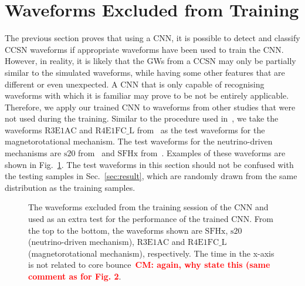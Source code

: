 \documentclass[aps,twocolumn,showpacs,groupedaddress, nofootinbib]{revtex4}  %
\newcommand{\cm}[1]{\textbf{\textcolor{red}{CM: #1}}}
\begin{document}
\section{Waveforms Excluded from Training}\label{sec:unseen}
%
%
The previous section proves that using a \ac{CNN}, it is possible to detect and
classify \ac{CCSN} waveforms if appropriate waveforms have been used to train
the \ac{CNN}. However, in reality, it is likely that the \acp{GW} from a
\ac{CCSN} may only be partially similar to the simulated waveforms, while
having some other features that are different or even unexpected. A \ac{CNN}
that is only capable of recognising waveforms with which it is familiar may
prove to be not be entirely applicable. Therefore, we apply our trained
\ac{CNN} to waveforms from other studies that were not used during the
training. Similar to the procedure used in~\cite{roma2019astrophysics}, we take
the waveforms $\text{R3E1AC}$ and $\text{R4E1FC\_L}$
from~\cite{scheidegger2010influence} as the test waveforms for the
magnetorotational mechanism. The test waveforms for the neutrino-driven
mechanisms are $\text{s}20$ from~\cite{andresen2017gravitational} and
$\text{SFHx}$ from~\cite{kuroda2016new}. Examples of these waveforms are shown
in Fig.~\ref{fig:Extratestwaveform}. The test waveforms in this section should
not be confused with the testing samples in Sec.~\ref{sec:result}, which are
randomly drawn from the same distribution as the training samples.

%
%
\begin{figure}
     \begin{center}
        \quad
    \end{center}
    \caption{The waveforms excluded from the training session of the \ac{CNN}
and used as an extra test for the performance of the trained \ac{CNN}. From the
top to the bottom, the waveforms shown are $\text{SFHx}$, $\text{s}20$
(neutrino-driven mechanism), $\text{R3E1AC}$ and $\text{R4E1FC\_L}$
(magnetorotational mechanism), respectively. The time in the x-axis is not
related to core bounce~\cm{again, why state this (same comment as for Fig.
2}.\label{fig:Extratestwaveform}} 
\end{figure}
\end{document}
